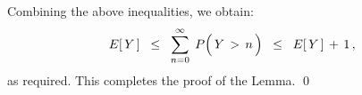 Combining the above inequalities, we obtain:
\begin{equation*}
E\!\left[\,Y\,\right]
\;\; \leq \;\;
	\overset{\infty}{\underset{n = 0}{\sum}}\;\,P\!\left(\, \overset{{\color{white}.}}{Y} \,>\, n \,\right)
\;\; \leq \;\;
	E\!\left[\,Y\,\right] \,+\, 1\,,
\end{equation*}
as required.
This completes the proof of the Lemma.
\qed


\renewcommand{\theenumi}{\roman{enumi}}
\renewcommand{\labelenumi}{\textnormal{(\theenumi)}$\;\;$}

